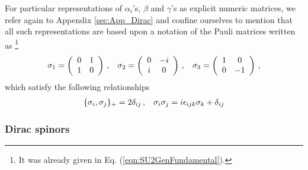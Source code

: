 For particular representations of  $\alpha_i$'s, $\beta$ and $\gamma$'s as
explicit numeric matrices, we refer again to Appendix \ref{sec:App_Dirac}
and confine ourselves to mention that all such representations are based upon
a notation of the Pauli matrices written as
\footnote{%
It was already given in Eq. (\ref{eqn:SU2GenFundamental}).
}%
\begin{eqnarray}
\sigma_1 =
\left(
\begin{array}{cc}
0 & 1 \\ 1 & 0
\end{array}
\right)\,,
\hspace{3mm}
\sigma_2 =
\left(
\begin{array}{cc}
0 & -i \\ i & 0
\end{array}
\right)\,,
\hspace{3mm}
\sigma_3 =
\left(
\begin{array}{cc}
1 &  0\\ 0 & -1
\end{array}
\right)\,,
\end{eqnarray}
which satisfy the following relationships
\begin{eqnarray}
\{
\sigma_i, \sigma_j \}_+ = 2 \delta_{ij}\,,
\hspace{3mm}
\sigma_i \sigma_j = i\epsilon_{ijk} \sigma_k + \delta_{ij}
\end{eqnarray}

\subsubsection{Dirac spinors}

